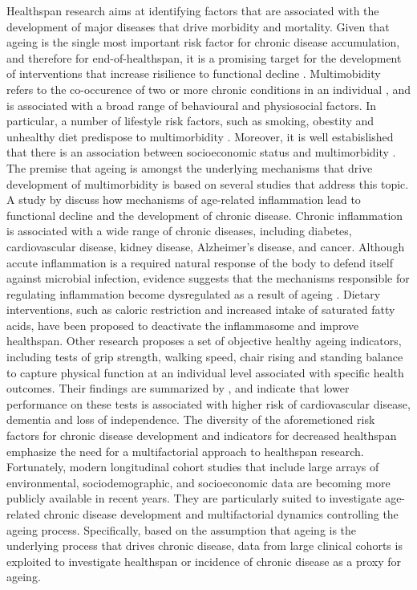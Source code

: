Healthspan research aims at identifying factors that are associated with the development of major diseases that drive morbidity and mortality. Given that ageing is the single most important risk factor for chronic disease accumulation, and therefore for end-of-healthspan, it is a promising target for the development of interventions that increase risilience to functional decline \citep{niccoli2012ageing}. Multimobidity refers to the co-occurence of two or more chronic conditions in an individual \citep{valderas2009defining}, and is associated with a broad range of behavioural and physiosocial factors. In particular, a number of lifestyle risk factors, such as smoking, obestity and unhealthy diet predispose to multimorbidity \citep{wikstrom2015clinical}. Moreover, it is well estabislished that there is an association between socioeconomic status and multimorbidity \citep{marmot2005social}. The premise that ageing is amongst the underlying mechanisms that drive development of multimorbidity is based on several studies that address this topic. A study by \cite{goldberg2015drivers} discuss how mechanisms of age-related inflammation lead to functional decline and the development of chronic disease. Chronic inflammation is associated with a wide range of chronic diseases, including diabetes, cardiovascular disease, kidney disease, Alzheimer's disease, and cancer. Although accute inflammation is a required natural response of the body to defend itself against microbial infection, evidence suggests that the mechanisms responsible for regulating inflammation become dysregulated as a result of ageing \citep{bruunsgaard2003age}. Dietary interventions, such as caloric restriction and increased intake of saturated fatty acids, have been proposed to deactivate the inflammasome and improve healthspan. Other research proposes a set of objective healthy ageing indicators, including tests of grip strength, walking speed, chair rising and standing balance to capture physical function at an individual level associated with specific health outcomes. Their findings are summarized by \cite{kuh2014life}, and indicate that lower performance on these tests is associated with higher risk of cardiovascular disease, dementia and loss of independence. The diversity of the aforemetioned risk factors for chronic disease development and indicators for decreased healthspan emphasize the need for a multifactorial approach to healthspan research. Fortunately, modern longitudinal cohort studies that include large arrays of environmental, sociodemographic, and socioeconomic data are becoming more publicly available in recent years. They are particularly suited to investigate age-related chronic disease development and multifactorial dynamics controlling the ageing process. Specifically, based on the assumption that ageing is the underlying process that drives chronic disease, data from large clinical cohorts is exploited to investigate healthspan or incidence of chronic disease as a proxy for ageing. 

